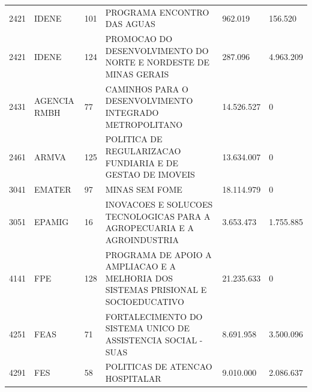 \documentclass{article}
\begin{document}
\begin{longtable}[c]{m{1cm}|m{1.5cm}|m{1cm}m{8cm}|m{2cm}m{2cm}}
\multicolumn{1}{C{1cm}|}{2421} & \multicolumn{1}{L{1.5cm}|}{IDENE} & \multicolumn{1}{C{1cm}|}{101} & \multicolumn{1}{L{8cm}|}{PROGRAMA ENCONTRO DAS AGUAS} & \multicolumn{1}{R{2cm}|}{962.019} & \multicolumn{1}{R{2cm}}{156.520} \\
\multicolumn{1}{C{1cm}|}{2421} & \multicolumn{1}{L{1.5cm}|}{IDENE} & \multicolumn{1}{C{1cm}|}{124} & \multicolumn{1}{L{8cm}|}{PROMOCAO DO DESENVOLVIMENTO DO NORTE E NORDESTE DE MINAS GERAIS} & \multicolumn{1}{R{2cm}|}{287.096} & \multicolumn{1}{R{2cm}}{4.963.209} \\
\multicolumn{1}{C{1cm}|}{2431} & \multicolumn{1}{L{1.5cm}|}{AGENCIA RMBH} & \multicolumn{1}{C{1cm}|}{77} & \multicolumn{1}{L{8cm}|}{CAMINHOS PARA O DESENVOLVIMENTO INTEGRADO METROPOLITANO} & \multicolumn{1}{R{2cm}|}{14.526.527} & \multicolumn{1}{R{2cm}}{            0} \\
\multicolumn{1}{C{1cm}|}{2461} & \multicolumn{1}{L{1.5cm}|}{ARMVA} & \multicolumn{1}{C{1cm}|}{125} & \multicolumn{1}{L{8cm}|}{POLITICA DE REGULARIZACAO FUNDIARIA E DE GESTAO DE IMOVEIS} & \multicolumn{1}{R{2cm}|}{13.634.007} & \multicolumn{1}{R{2cm}}{            0} \\
\multicolumn{1}{C{1cm}|}{3041} & \multicolumn{1}{L{1.5cm}|}{EMATER} & \multicolumn{1}{C{1cm}|}{97} & \multicolumn{1}{L{8cm}|}{MINAS SEM FOME} & \multicolumn{1}{R{2cm}|}{18.114.979} & \multicolumn{1}{R{2cm}}{            0} \\
\multicolumn{1}{C{1cm}|}{3051} & \multicolumn{1}{L{1.5cm}|}{EPAMIG} & \multicolumn{1}{C{1cm}|}{16} & \multicolumn{1}{L{8cm}|}{INOVACOES E SOLUCOES TECNOLOGICAS PARA A AGROPECUARIA E A AGROINDUSTRIA} & \multicolumn{1}{R{2cm}|}{3.653.473} & \multicolumn{1}{R{2cm}}{1.755.885} \\
\multicolumn{1}{C{1cm}|}{4141} & \multicolumn{1}{L{1.5cm}|}{FPE} & \multicolumn{1}{C{1cm}|}{128} & \multicolumn{1}{L{8cm}|}{PROGRAMA DE APOIO A AMPLIACAO E A MELHORIA DOS SISTEMAS PRISIONAL E SOCIOEDUCATIVO} & \multicolumn{1}{R{2cm}|}{21.235.633} & \multicolumn{1}{R{2cm}}{            0} \\
\multicolumn{1}{C{1cm}|}{4251} & \multicolumn{1}{L{1.5cm}|}{FEAS} & \multicolumn{1}{C{1cm}|}{71} & \multicolumn{1}{L{8cm}|}{FORTALECIMENTO DO SISTEMA UNICO DE ASSISTENCIA SOCIAL - SUAS} & \multicolumn{1}{R{2cm}|}{8.691.958} & \multicolumn{1}{R{2cm}}{3.500.096} \\
\multicolumn{1}{C{1cm}|}{4291} & \multicolumn{1}{L{1.5cm}|}{FES} & \multicolumn{1}{C{1cm}|}{58} & \multicolumn{1}{L{8cm}|}{POLITICAS DE ATENCAO HOSPITALAR} & \multicolumn{1}{R{2cm}|}{9.010.000} & \multicolumn{1}{R{2cm}}{2.086.637} \\

\end{longtable}
\end{document}
